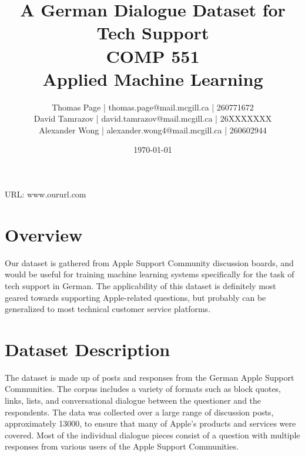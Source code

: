 \documentclass[12pt]{article}
\title{A German Dialogue Dataset for Tech Support\\ COMP 551 \\ Applied Machine Learning} %
\author{
Thomas Page | thomas.page@mail.mcgill.ca | 260771672 \\
David Tamrazov | david.tamrazov@mail.mcgill.ca | 26XXXXXXX \\
Alexander Wong | alexander.wong4@mail.mcgill.ca | 260602944} %
\date{\today} %
\begin{document}
\maketitle %


%

\begin{center}
URL: www.oururl.com
\end{center}


\section{Overview}
Our dataset is gathered from Apple Support Community discussion boards, and would be useful for training machine learning systems specifically for the task of tech support in German. The applicability of this dataset is definitely most geared towards supporting Apple-related questions, but probably can be generalized to most technical customer service platforms.


\section{Dataset Description}
The dataset is made up of posts and responses from the German Apple Support Communities. The corpus includes a variety of formats such as block quotes, links, lists, and conversational dialogue between the questioner and the respondents. The data was collected over a large range of discussion posts, approximately 13000, to ensure that many of Apple's products and services were covered. Most of the individual dialogue pieces consist of a question with multiple responses from various users of the Apple Support Communities.\\
\end{document}
